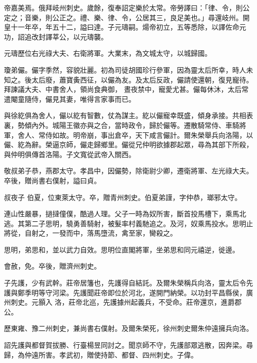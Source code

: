 \begin{pinyinscope}
 帝嘉美焉。俄拜岐州刺史。歲餘，復奉詔定樂於太常。帝勞譯曰：「律、令，則公定之；音樂，則公正之。禮、樂、律、令，公居其三，良足美也。」尋還岐州。開皇十一年卒，年五十二，謚曰達。子元璹嗣。煬帝初立，五等悉除，以譯佐命元功，詔追改封譯莘公，以元璹襲。



 元璹歷位右光祿大夫、右衛將軍。大業末，為文城太守，以城歸國。



 瓊弟儼。儼字季然，容貌壯麗。初為司徒胡國珍行參軍，因為靈太后所幸，時人未知之。後太后廢，蕭寶夤西征，以儼為友。及太后反政，儼請使還朝，復見寵待。拜諫議大夫、中書舍人，領尚食典御，
 晝夜禁中，寵愛尤甚。儼每休沐，太后常遣閹童隨侍，儼見其妻，唯得言家事而已。



 與徐紇俱為舍人，儼以紇有智數，仗為謀主。紇以儼寵幸既盛，傾身承接。共相表裏，勢傾內外。城陽王徽亦與之合，當時政令，歸於儼等。遷散騎常侍、車騎將軍，舍人、常侍如故。明帝崩，事出倉卒，天下咸言儼計。爾朱榮舉兵向洛陽，以儼、紇為辭。榮逼京師，儼走歸鄉里。儼從兄仲明欲據郡起眾，尋為其部下所殺，與仲明俱傳首洛陽。子文寬從武帝入關西。



 敬叔弟子恭，燕郡太守。孝昌中，因儼勢，除衛尉少卿，遷衛將軍、左光祿大夫。卒後，贈尚書右僕射，謚曰貞。



 叔夜子
 伯夏，位東萊太守。卒，贈青州刺史。伯夏弟謹，字仲恭，瑯邪太守。



 連山性嚴暴，撾撻僮僕，酷過人理。父子一時為奴所害，斷首投馬槽下，乘馬北逃。其第二子思明，驍勇善騎射，被髮率村義馳追之。及河，奴乘馬投水。思明止將從，自射之，一發而中，落馬墮流，禽至家，臠殺之。



 思明，弟思和，並以武力自效。思明位直閣將軍，坐弟思和同元禧逆，徙邊。



 會赦，免。卒後，贈濟州刺史。



 子先護，少有武幹。莊帝居籓也，先護得自結託。及爾朱榮稱兵向洛，靈太后令先護與鄭季明等守河梁。先護聞莊帝即位於河北，遂開門納榮。以功封平昌縣侯，廣州刺史。元顥入
 洛，莊帝北巡，先護據州起義兵，不受命。莊帝還京，進爵郡公。



 歷東雍、豫二州刺史，兼尚書右僕射。及爾朱榮死，徐州刺史爾朱仲遠擁兵向洛。



 詔先護與都督賀拔勝、行臺楊昱同討之。聞京師不守，先護部眾逃散，因奔梁。尋歸，為仲遠所害。孝武初，贈使持節、都督、四州刺史。子偉。




\end{pinyinscope}
